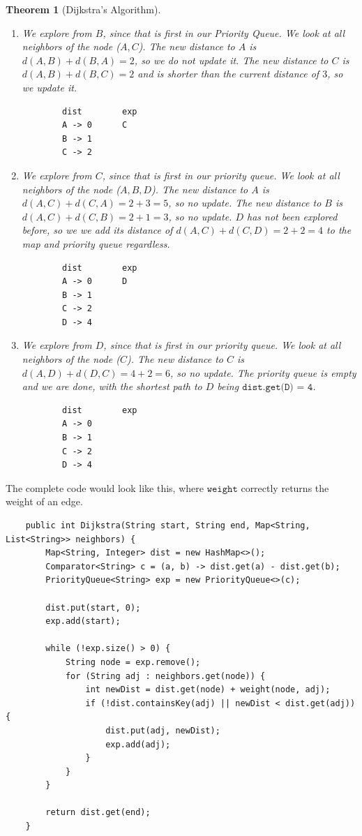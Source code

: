\documentclass{article}
\newtheorem{theorem}{Theorem}[section]
\theoremstyle{definition}
\theoremstyle{remark}
\theoremstyle{definition}
\begin{document}
\begin{theorem}[Dijkstra's Algorithm]
\begin{enumerate}
    \item We explore from $B$, since that is first in our Priority Queue. We look at all neighbors of the node ($A, C$). The new distance to $A$ is $d(A, B) + d(B, A) = 2$, so we do not update it. The new distance to $C$ is $d(A, B) + d(B, C) = 2$ and is shorter than the current distance of $3$, so we update it. 
    \begin{verbatim}
        dist        exp 
        A -> 0      C
        B -> 1      
        C -> 2      
    \end{verbatim}
    
    \item We explore from $C$, since that is first in our priority queue. We look at all neighbors of the node ($A, B, D$). The new distance to $A$ is $d(A, C) + d(C, A) = 2 + 3 = 5$, so no update. The new distance to $B$ is $d(A, C) + d(C, B) = 2 + 1 = 3$, so no update. $D$ has not been explored before, so we we add its distance of $d(A, C) + d(C, D) = 2 + 2 = 4$ to the map and priority queue regardless. 
    \begin{verbatim}
        dist        exp 
        A -> 0      D 
        B -> 1       
        C -> 2     
        D -> 4
    \end{verbatim}
    
    \item We explore from $D$, since that is first in our priority queue. We look at all neighbors of the node ($C$). The new distance to $C$ is $d(A, D) + d(D, C) = 4 + 2 = 6$, so no update. The priority queue is empty and we are done, with the shortest path to $D$ being $\texttt{dist.get(D) = 4}$. 
    \begin{verbatim}
        dist        exp 
        A -> 0  
        B -> 1       
        C -> 2     
        D -> 4
    \end{verbatim}
    
\end{enumerate}
\end{theorem}

The complete code would look like this, where $\texttt{weight}$ correctly returns the weight of an edge. 
\begin{verbatim}
    public int Dijkstra(String start, String end, Map<String, List<String>> neighbors) {
        Map<String, Integer> dist = new HashMap<>(); 
        Comparator<String> c = (a, b) -> dist.get(a) - dist.get(b); 
        PriorityQueue<String> exp = new PriorityQueue<>(c); 
        
        dist.put(start, 0); 
        exp.add(start); 
        
        while (!exp.size() > 0) {
            String node = exp.remove(); 
            for (String adj : neighbors.get(node)) {
                int newDist = dist.get(node) + weight(node, adj); 
                if (!dist.containsKey(adj) || newDist < dist.get(adj)) {
                    dist.put(adj, newDist); 
                    exp.add(adj); 
                }
            }
        }
        
        return dist.get(end); 
    }
\end{verbatim}
\end{document}
